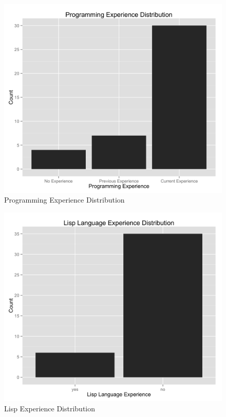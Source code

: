 \begin{figure}
    \centering
    \includegraphics[width=1.0\linewidth]{../study-2/results/graphs/programming.png}
    \caption{Programming Experience Distribution}
    \label{programmingdistribution}
\end{figure}


\begin{figure}
    \centering
    \includegraphics[width=1.0\linewidth]{../study-2/results/graphs/lisp.png}
    \caption{Lisp Experience Distribution}
    \label{lispdistribution}
\end{figure}


